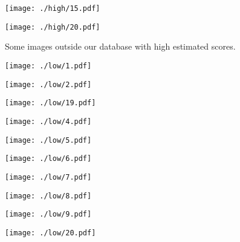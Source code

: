\documentclass[runningheads]{llncs}
\begin{document}
\begin{figure*}
    \begin{minipage}{0.5\textwidth}
        \centering
        \texttt{[image: ./high/15.pdf]}
\end{minipage}\begin{minipage}{0.5\textwidth}
        \centering
        \texttt{[image: ./high/20.pdf]}
\end{minipage}
    \vspace{10mm}
    \caption{Some images outside our database with high estimated scores.}
    \label{fig:highImages}
\end{figure*}


\begin{figure*}[!htb]
    \centering
    \begin{minipage}{.5\textwidth}
        \centering
        \texttt{[image: ./low/1.pdf]}
\end{minipage}\begin{minipage}{0.5\textwidth}
        \centering
        \texttt{[image: ./low/2.pdf]}
\end{minipage}

    \begin{minipage}{0.5\textwidth}
        \centering
        \texttt{[image: ./low/19.pdf]}
\end{minipage}\begin{minipage}{0.5\textwidth}
        \centering
        \texttt{[image: ./low/4.pdf]}
\end{minipage}

    \begin{minipage}{0.5\textwidth}
        \centering
        \texttt{[image: ./low/5.pdf]}
\end{minipage}\begin{minipage}{0.5\textwidth}
        \centering
        \texttt{[image: ./low/6.pdf]}
\end{minipage}

    \begin{minipage}{0.5\textwidth}
        \centering
        \texttt{[image: ./low/7.pdf]}
\end{minipage}\begin{minipage}{0.5\textwidth}
        \centering
        \texttt{[image: ./low/8.pdf]}
\end{minipage}

    \begin{minipage}{0.5\textwidth}
        \centering
        \texttt{[image: ./low/9.pdf]}
\end{minipage}\begin{minipage}{0.5\textwidth}
        \centering
        \texttt{[image: ./low/20.pdf]}
\end{minipage}


\end{figure*}
\end{document}
